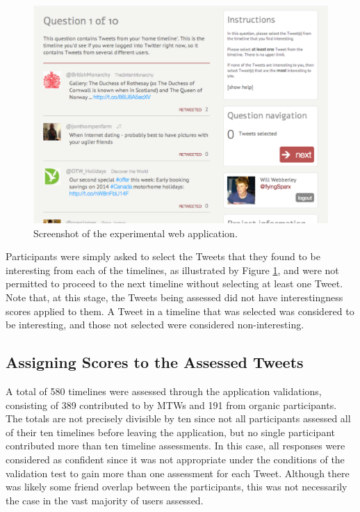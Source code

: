 \begin{figure}[h]
\centering
\includegraphics[scale=0.35]{5.Chapter3/Media/twinterest.png} 
\caption{Screenshot of the experimental web application.}
\label{fig:twinterest}
\end{figure}

Participants were simply asked to select the Tweets that they found to be interesting from each of the timelines, as illustrated by Figure \ref{fig:twinterest}, and were not permitted to proceed to the next timeline without selecting at least one Tweet. Note that, at this stage, the Tweets being assessed did not have interestingness scores applied to them. A Tweet in a timeline that was selected was considered to be interesting, and those not selected were considered non-interesting.


\subsection{Assigning Scores to the Assessed Tweets}
A total of 580 timelines were assessed through the application validations, consisting of 389 contributed to by MTWs and 191 from organic participants. The totals are not precisely divisible by ten since not all participants assessed all of their ten timelines before leaving the application, but no single participant contributed more than ten timeline assessments. In this case, all responses were considered as confident since it was not appropriate under the conditions of the validation test to gain more than one assessment for each Tweet. Although there was likely some friend overlap between the participants, this was not necessarily the case in the vast majority of users assessed.  

